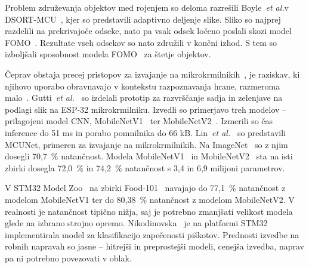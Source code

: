 \documentclass[a4paper,twoside,openright,12pt,slovene]{book}
\newcommand{\etal}{\textit{et al.}} %
\begin{document}
        Problem združevanja objektov med rojenjem so deloma razrešili
        Boyle~\etal v DSORT-MCU~\cite{src:boyle2024dsort}, kjer so predstavili
        adaptivno deljenje slike. Sliko so najprej razdelili na prekrivajoče
        odseke, nato pa vsak odsek ločeno poslali skozi model
        FOMO~\cite{src:fomodocs}. Rezultate vseh odsekov so nato združili v končni
        izhod. S tem so izboljšali sposobnost modela FOMO~\cite{src:fomodocs}
        za štetje objektov.
        
        Čeprav obstaja precej pristopov za izvajanje na
        mikrokrmilnikih~\cite{src:abadade2023comprehensive}, je raziskav, ki
        njihovo uporabo obravnavajo v kontekstu razpoznavanja hrane, razmeroma
        malo~\cite{src:moumane2023food, src:Nikodinovska_2024}.
        Gutti~\etal~\cite{src:gutti2022real} so izdelali prototip za
        razvrščanje sadja in zelenjave na podlagi slik na ESP-32
        mikrokrmilniku. Izvedli so primerjavo treh modelov -- prilagojeni model CNN,
        MobileNetV1~\cite{src:howard2017mobilenets} ter
        MobileNetV2~\cite{src:sandler2018mobilenetv2}. Izmerili so čas
        inference do 51 ms in porabo pomnilnika do 66 kB.
        Lin~\etal~\cite{src:lin2020mcunet} so predstavili MCUNet, primeren za
        izvajanje na mikrokrmilnikih. Na
        ImageNet~\cite{src:russakovsky2015imagenet} so z njim dosegli 70{,}7~\%
        natančnost. Modela MobileNetV1~\cite{src:howard2017mobilenets} in
        MobileNetV2~\cite{src:sandler2018mobilenetv2} sta na isti zbirki
        dosegla 72{,}0~\% in 74{,}2~\% natančnost s 3{,}4 in 6{,}9 milijoni
        parametrov. 

        V STM32 Model Zoo~\cite{src:stm32modelzoo} na zbirki
        \mbox{Food-101}~\cite{src:bossard2014food} navajajo do 77{,}1~\%
        natančnost z modelom MobileNetV1 ter do 80{,}38~\% natančnost z modelom MobileNetV2. V
        realnosti je natančnost tipično nižja, saj je potrebno zmanjšati
        velikost modela glede na izbrano strojno opremo.
        Nikodinovska~\cite{src:Nikodinovska_2024} je na platformi STM32 implementirala model za klasifikacijo zapečenosti piškotov. 
        Prednosti izvedbe na robnih napravah so jasne -- hitrejši in
        preprostejši modeli, cenejša izvedba, naprav pa ni potrebno povezovati
        v oblak.

\end{document}
